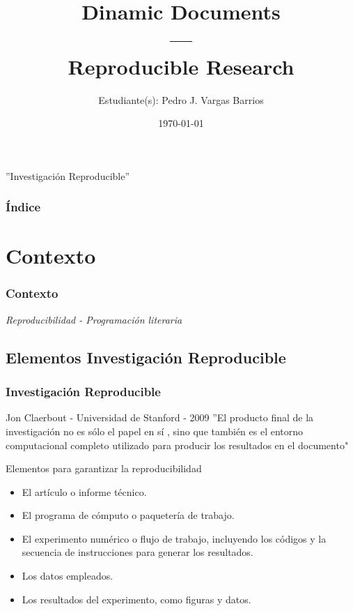 \documentclass[11pt]{beamer}					%
\title{Dinamic Documents \\ --- \\ Reproducible Research}
\author{Estudiante(s): Pedro J. Vargas Barrios}
\institute[UD]{Universidad Distrital Francisco José de Caldas}
\date{\today}
\begin{document}
	
	
	\begin{frame}[fragile]							%
		\titlepage 
		\begin{small}
			''Investigación Reproducible''
		\end{small}
	\end{frame}	

    	\begin{frame}[fragile]							%
		\frametitle{Índice}	
		\tableofcontents
	\end{frame}	

\section{Contexto}
		 \begin{frame}[fragile]						%
			\frametitle{Contexto}
			\begin{huge}
			\begin{center}
				\emph{\textit{Reproducibilidad - Programación literaria}}
			\end{center}
			\end{huge}
		\end{frame}	
	\subsection{Elementos Investigación Reproducible}	
		\begin{frame}[fragile]						%
				\frametitle{Investigación Reproducible}
				\begin{block}{Jon Claerbout - Universidad de Stanford - 2009}
''El producto final de la
investigación no es sólo el papel en sí , sino que también es
el entorno computacional completo utilizado para producir los resultados en el documento"
				\end{block}
				\begin{block}{Elementos para garantizar la reproducibilidad}	
				
				\begin{itemize}
				\item El artículo o informe técnico.
				\item El programa de cómputo o paquetería de trabajo.
				\item El experimento numérico o flujo de trabajo, incluyendo los códigos y la secuencia de instrucciones para generar los resultados.
				\item Los datos empleados.
				\item Los resultados del experimento, como figuras y datos.
				\end{itemize}
				

				\end{block}			
			\end{frame}	
			
\end{document}
